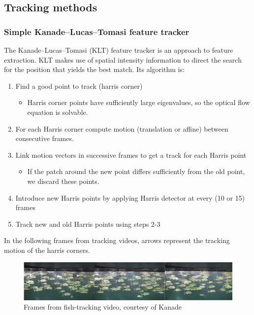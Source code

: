 \documentclass{article}
\begin{document}
\subsection{Tracking methods}
\subsubsection{Simple Kanade–Lucas–Tomasi feature tracker}

The Kanade–Lucas–Tomasi (KLT) feature tracker is an approach to feature extraction. KLT makes use of spatial intensity information to direct the search for the position that yields the best match. Its algorithm is:

\begin{enumerate}
\item Find a good point to track (harris corner) 
\begin{itemize}
\item Harris corner points have sufficiently large eigenvalues, so the optical flow equation is solvable. 
\end{itemize}
\item For each Harris corner compute motion (translation or affine) between consecutive	frames.
\item Link motion vectors in successive frames to get a track for each Harris point
\begin{itemize}
\item If the patch around the new point differs sufficiently from the old point, we discard these points.  
\end{itemize}
\item Introduce	new Harris points by applying Harris detector at every (10 or 15) frames	
\item Track	new	and	old	Harris points using steps 2-3
\end{enumerate}

In the following frames from tracking videos, arrows represent the tracking motion of the harris corners. 

\begin{figure}[h]
  \centering
  \includegraphics[width=\linewidth]{fish.png}
  \caption{Frames from fish-tracking video, courtesy of Kanade}
\end{figure}
\end{document}
